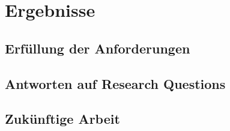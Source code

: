 \chapter{Ergebnisse}\label{ch:ergebnisse}

\section{Erfüllung der Anforderungen}\label{sec:requirements-fulfillment}

\section{Antworten auf Research Questions}\label{sec:research-questions-answers}

\section{Zukünftige Arbeit}\label{sec:future-work}

